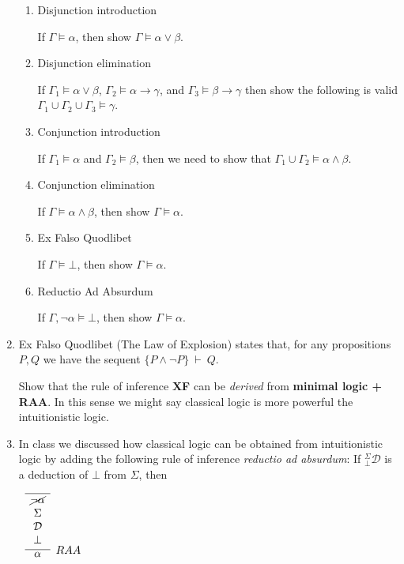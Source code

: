 \documentclass[11pt]{report}
\begin{document}
\begin{enumerate}
\begin{enumerate}
			\item Disjunction introduction
					
			If $\Gamma \models \alpha$, then show $\Gamma \models \alpha \lor \beta$.
			
			\item Disjunction elimination
			
			If $\Gamma_{1} \models \alpha \lor \beta$, $\Gamma_{2} \models \alpha \rightarrow \gamma$, and $\Gamma_{3} \models \beta \rightarrow \gamma$ then show the following is valid $\Gamma_{1}\cup\Gamma_{2}\cup\Gamma_{3} \models \gamma$.
			
			\item Conjunction introduction
			
			If $\Gamma_{1} \models \alpha$ and $\Gamma_{2} \models \beta$, then we need to show that $\Gamma_{1} \cup \Gamma_{2} \models \alpha \land \beta$. 
			
			\item Conjunction elimination
			
			If $\Gamma \models \alpha\land\beta$, then show $\Gamma \models \alpha$.

			\item Ex Falso Quodlibet
			
			If $\Gamma \models \bot$, then show $\Gamma \models \alpha$.
			
			\item Reductio Ad Absurdum
			
			If $\Gamma, \lnot \alpha \models \bot$, then show $\Gamma \models \alpha$.
	
		\end{enumerate}

	\item Ex Falso Quodlibet (The Law of Explosion) states that, for any propositions $P,Q$ we have the sequent $\{P \land \lnot P\} \ \vdash \ Q$. 
	
	Show that the rule of inference {\bf XF} can be \emph{derived} from {\bf minimal logic + RAA}. In this sense we might say classical logic is more powerful the intuitionistic logic.
	
	\newpage
	\item In class we discussed how classical logic can be obtained from intuitionistic logic by adding the following rule of inference \emph{reductio ad absurdum}: If $^{\Sigma}_{\bot}\mathcal{D}$ is a deduction of $\bot$ from $\Sigma$, then
	
	\begin{center}		
		$\begin{array}{c}		
		\infer[RAA]{\alpha}
		{\begin{array}{c} \hline \cancel{\lnot\alpha} \\ \Sigma \\ \mathcal{D} \\ \bot \end{array}}
		\end{array}$
	\end{center}
	

\end{enumerate}
\end{document}
